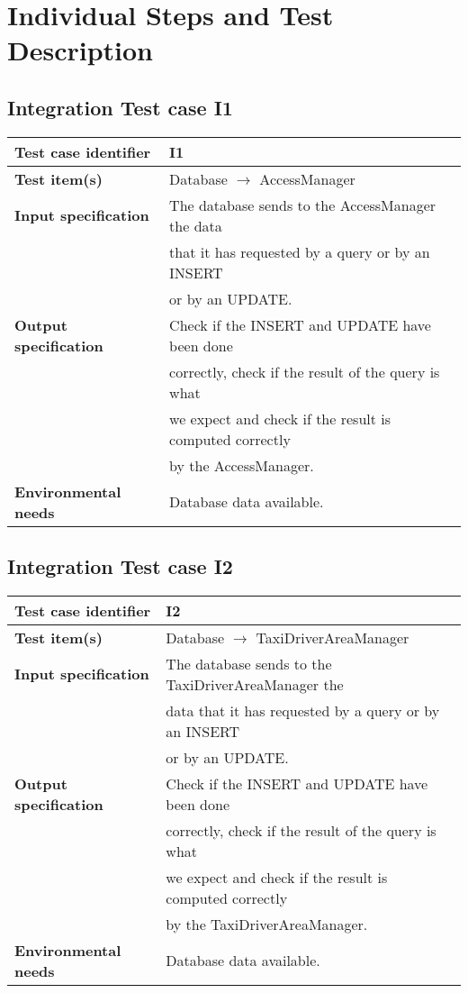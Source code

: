 \documentclass[18pt,oneside,a4paper, titlepage]{article}
\begin{document}
\section{Individual	Steps	and	Test	Description}
	\subsection{Integration Test case I1}
		\begin{tabular}{ l l}
			\hline 		\textbf{Test case identifier} & I1 \\
			\hline		\textbf{Test item(s)}  & Database $\rightarrow$ AccessManager \\
			\hline		\textbf{Input specification} & The database sends to the AccessManager the data \\ & that it has requested by a query or by an INSERT \\ & or by an UPDATE. \\
			\hline		\textbf{Output specification} & Check if the INSERT and UPDATE have been done\\ & correctly, check if the result of the query is what\\ &  we expect and check if the result is computed correctly\\ & by the AccessManager.\\
			\hline		\textbf{Environmental needs} & Database data available.\\
			\hline
		\end{tabular}
	\subsection{Integration Test case I2}
		\begin{tabular}{ l l}
			\hline 		\textbf{Test case identifier} & I2 \\
			\hline		\textbf{Test item(s)}  & Database $\rightarrow$ TaxiDriverAreaManager \\
			\hline		\textbf{Input specification} & The database sends to the TaxiDriverAreaManager the\\ & data that it has requested by a query or by an INSERT \\ & or by an UPDATE.\\
			\hline		\textbf{Output specification} &  Check if the INSERT and UPDATE have been done\\ & correctly, check if the result of the query is what\\ &  we expect and check if the result is computed correctly\\ & by the TaxiDriverAreaManager.\\
			\hline		\textbf{Environmental needs} & Database data available.\\
			\hline
		\end{tabular}
\end{document}
